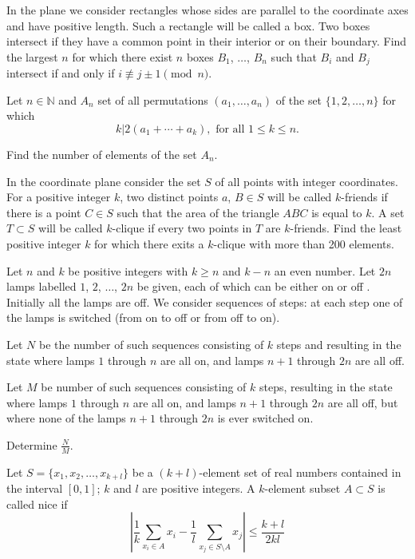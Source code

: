 \item[\textbf{C1.}]
In the plane we consider rectangles whose sides are parallel to the coordinate axes and have positive length. Such a rectangle will be called a 
box. Two boxes 
intersect
 if they have a common point in their interior or on their boundary. Find the largest 
$ n$
 for which there exist 
$ n$
 boxes 
$ B_1$, 
$ \ldots$, 
$ B_n$
 such that 
$ B_i$
 and 
$ B_j$
 intersect if and only if 
$ i\not\equiv j\pm 1\pmod n$.

\item[\textbf{C2.}]
Let 
$n \in \mathbb N$
 and 
$A_n$
 set of all permutations 
$(a_1, \ldots, a_n)$
 of the set 
$\{1, 2, \ldots , n\}$
 for which
\[k|2(a_1 + \cdots+ a_k), \text{ for all } 1 \leq k \leq n.\]

Find the number of elements of the set 
$A_n$.

\item[\textbf{C3.}]
In the coordinate plane consider the set 
$ S$
 of all points with integer coordinates. For a positive integer 
$ k$, 
 two distinct points 
$ a$,
$ B\in S$
 will be called 
$ k$-friends
 if there is a point 
$ C\in S$
 such that the area of the triangle 
$ ABC$
 is equal to 
$ k$.
 A set 
$ T\subset S$
 will be called 
$ k$-clique
 if every two points in 
$ T$
 are 
$ k$-friends. Find the least positive integer 
$ k$
 for which there exits a 
$ k$-clique with more than 200 elements.

\item[\textbf{C4.}]
Let 
$ n$
 and 
$ k$
 be positive integers with 
$ k \geq n$
 and 
$ k - n$
 an even number. Let 
$ 2n$
 lamps labelled 
$ 1$, 
$ 2$, 
$\dots$, 
$ 2n$
 be given, each of which can be either 
on
 or 
off
. Initially all the lamps are off. We consider sequences of steps: at each step one of the lamps is switched (from on to off or from off to on).


Let 
$ N$
 be the number of such sequences consisting of 
$ k$
 steps and resulting in the state where lamps 
$ 1$
 through 
$ n$
 are all on, and lamps 
$ n + 1$
 through 
$ 2n$
 are all off.


Let 
$ M$
 be number of such sequences consisting of 
$ k$
 steps, resulting in the state where lamps 
$ 1$
 through 
$ n$
 are all on, and lamps 
$ n + 1$
 through 
$ 2n$
 are all off, but where none of the lamps 
$ n + 1$
 through 
$ 2n$
 is ever switched on.


Determine 
$ \frac{N}{M}$.

\item[\textbf{C5.}]
Let 
$ S = \{x_1, x_2, \ldots, x_{k + l}\}$
 be a 
$ (k + l)$-element set of real numbers contained in the interval 
$ [0, 1]$; $k$
 and 
$ l$
 are positive integers. A 
$ k$-element subset 
$ A\subset S$
 is called 
nice
 if
\[ \left |\frac {1}{k}\sum_{x_i\in A} x_i - \frac {1}{l}\sum_{x_j\in S\setminus A} x_j\right |\le \frac {k + l}{2kl}\]


